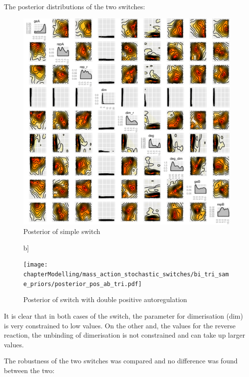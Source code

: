 The posterior distributions of the two switches:

\begin{figure}[t]
\begin{center}
\includegraphics[scale=0.5]{chapterModelling/mass_action_stochastic_switches/bi_tri_same_priors/posterior_std_tri.pdf}
\caption{Posterior of simple switch}\label{fig_2}
\end{center}
\end{figure}

\begin{figure}b]
\begin{center}
\texttt{[image: chapterModelling/mass\_action\_stochastic\_switches/bi\_tri\_same\_priors/posterior\_pos\_ab\_tri.pdf]}
\caption{Posterior of switch with double positive autoregulation}\label{fig_3}
\end{center}
\end{figure}
\clearpage
It is clear that in both cases of the switch, the parameter for dimerisation (dim) is very constrained to low values. On the other and, the values for the reverse reaction, the unbinding of dimerisation is not constrained and can take up larger values. 

The robustness of the two switches was compared and no difference was found between the two:


